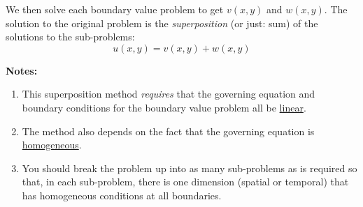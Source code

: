\vspace{0.25cm}


\noindent We then solve each boundary value problem to get $v(x,y)$ and $w(x,y)$.  The solution to the original problem is the \emph{superposition} (or just: sum) of the solutions to the sub-problems:
\begin{equation*}
u(x,y) = v(x,y) + w(x,y)
\end{equation*}

\vspace{0.25cm}

\noindent\textbf{Notes:}

\begin{enumerate}
\item This superposition method \emph{requires} that the governing equation and boundary conditions for the boundary value problem all be \underline{linear}.  
\item The method also depends on the fact that the governing equation is \underline{homogeneous}.
\item You should break the problem up into as many sub-problems as is required so that, in each sub-problem, there is one dimension (spatial or temporal) that has homogeneous conditions at all boundaries.
\end{enumerate}
